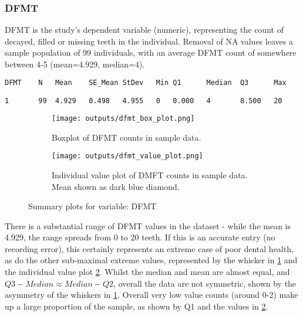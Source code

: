 \documentclass[11pt]{article}
\begin{document}
\subsubsection*{DFMT}
DFMT is the study's dependent variable (numeric), representing the count of decayed, filled or missing teeth in the individual. Removal of NA values leaves a sample population of 99 individuals, with an average DFMT count of somewhere between 4-5 (mean=4.929, median=4).
\begin{lstlisting}[language=TeX, caption={Summary statistics for variable: DFMT}]
DFMT    N   Mean    SE_Mean StDev   Min Q1      Median  Q3      Max

1       99  4.929   0.498   4.955   0   0.000   4       8.500   20
\end{lstlisting}

\begin{figure}[ht]
  \begin{subfigure}{0.48\linewidth}
    \centering
    \texttt{[image: outputs/dfmt\_box\_plot.png]}
    \caption{Boxplot of DFMT counts in sample data.\newline}
    \label{fig:dfmt_boxplot}
  \end{subfigure}%
  \hfill
  \begin{subfigure}{0.48\linewidth}
    \centering
    \texttt{[image: outputs/dfmt\_value\_plot.png]}
    \caption{Individual value plot of DMFT counts in sample data. Mean shown as dark blue diamond.}
    \label{fig:dfmt_valueplot}
  \end{subfigure}
  \caption{Summary plots for variable: DFMT}
  \label{fig:dfmt_figures}
\end{figure}
\FloatBarrier  %

There is a substantial range of DFMT values in the dataset - while the mean is 4.929, the range spreads from 0 to 20 teeth. If this is an accurate entry (no recording error), this certainly represents an extreme case of poor dental health, as do the other sub-maximal extreme values, represented by the whisker in \ref{fig:dfmt_boxplot} and the individual value plot \ref{fig:dfmt_valueplot}. Whilst the median and mean are almost equal, and \(Q3-Median \approx Median-Q2\), overall the data are not symmetric, shown by the asymmetry of the whiskers in \ref{fig:dfmt_boxplot}. Overall very low value counts (around 0-2) make up a large proportion of the sample, as shown by Q1 and the values in \ref{fig:dfmt_valueplot}.
\end{document}
